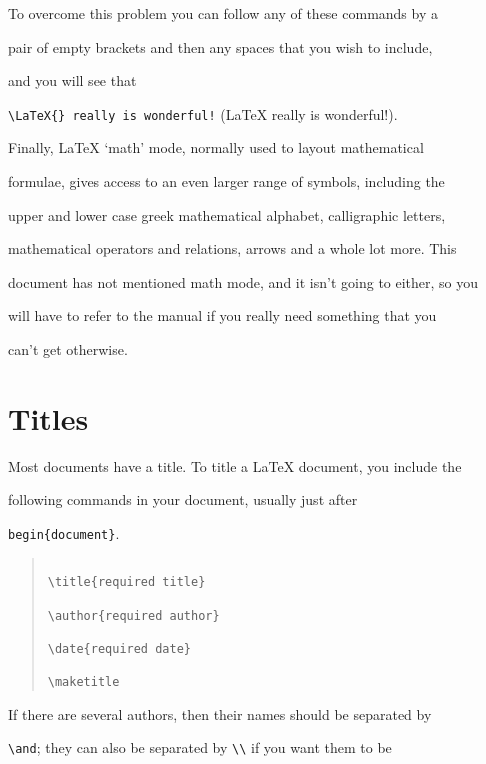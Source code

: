 To overcome this problem you can follow any of these commands by a

pair of empty brackets and then any spaces that you wish to include,

and you will see that

\verb|\LaTeX{} really is wonderful!| (\LaTeX{} really is wonderful!).



Finally, \LaTeX{} `math' mode, normally used to layout mathematical

formulae, gives access to an even larger range of symbols, including the

upper and lower case greek mathematical alphabet, calligraphic letters,

mathematical operators and relations, arrows and a whole lot more.  This

document has not mentioned math mode, and it isn't going to either, so you

will have to refer to the manual if you really need something that you

can't get otherwise.



\section{Titles}\label{sec:title}



Most documents have a title.  To title a \LaTeX{} document, you include the

following commands in your document, usually just after

\verb|begin{document}|.

\begin{quote}\footnotesize\begin{verbatim}

\title{required title}

\author{required author}

\date{required date}

\maketitle

\end{verbatim}\end{quote}

If there are several authors, then their names should be separated by

\verb|\and|; they can also be separated by \verb|\\| if you want them to be

